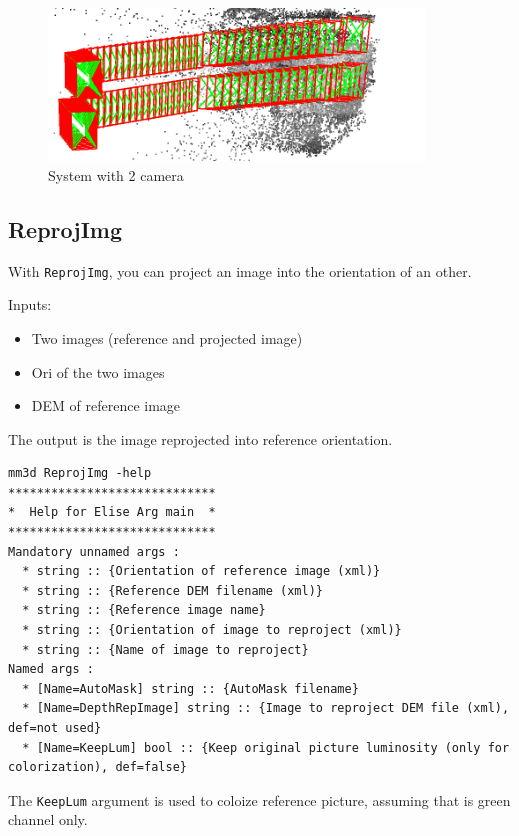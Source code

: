 \begin{figure}[H]
\centering
\includegraphics[width=10cm]{FIGS/InitOriLinear/InitAllImg2Turn01.png}
\caption{System with 2 camera}
\label{SurfCorr}
\end{figure}

\subsection{ReprojImg}

With {\tt ReprojImg}, you can project an image into the orientation of an other.

Inputs:
\begin{itemize}
\item Two images (reference and projected image)
\item Ori of the two images
\item DEM of reference image
\end{itemize}

The output is the image reprojected into reference orientation.

\begin{verbatim}
mm3d ReprojImg -help
*****************************
*  Help for Elise Arg main  *
*****************************
Mandatory unnamed args : 
  * string :: {Orientation of reference image (xml)}
  * string :: {Reference DEM filename (xml)}
  * string :: {Reference image name}
  * string :: {Orientation of image to reproject (xml)}
  * string :: {Name of image to reproject}
Named args : 
  * [Name=AutoMask] string :: {AutoMask filename}
  * [Name=DepthRepImage] string :: {Image to reproject DEM file (xml), def=not used}
  * [Name=KeepLum] bool :: {Keep original picture luminosity (only for colorization), def=false}
\end{verbatim}

The {\tt KeepLum} argument is used to coloize reference picture, assuming that is green channel only.

